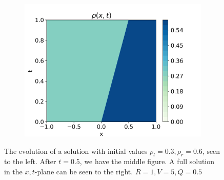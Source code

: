 \documentclass[10pt]{article}
\numberwithin{equation}{section}
\begin{document}
\begin{figure}
     \begin{subfigure}[b]{0.3\textwidth}
         \centering
         \includegraphics[width=\textwidth]{Figures/Model/ForwShockFull.png}
     \end{subfigure}
        \caption{The evolution of a solution with initial values $\rho_l = 0.3, \rho_r = 0.6$, seen to the left. After $t = 0.5$, we have the middle figure. A full solution in the $x,t$-plane can be seen to the right. $R = 1, V = 5, Q = 0.5$}
        \label{fig:ExampleForwardShock}
\end{figure}
\end{document}
